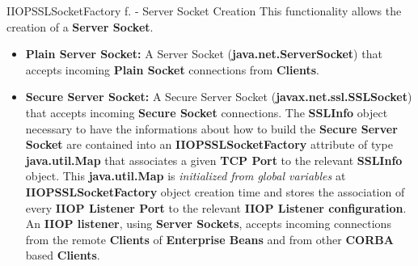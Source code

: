 \documentclass{../common/latex_classes/pdf_presentation}
\begin{document}
	\begin{frame}{IIOPSSLSocketFactory f. - Server Socket Creation}
		This functionality allows the creation of a \textbf{Server Socket}.
		\begin{itemize}
			\item \textbf{Plain Server Socket:}
				A Server Socket (\textbf{java.net.ServerSocket}) that accepts incoming \textbf{Plain Socket} connections from \textbf{Clients}.
			\item \textbf{Secure Server Socket:}
				A Secure Server Socket (\textbf{javax.net.ssl.SSLSocket}) that accepts incoming \textbf{Secure Socket} connections.
				The \textbf{SSLInfo} object necessary to have the informations about how to build the \textbf{Secure Server Socket} are contained into an \textbf{IIOPSSLSocketFactory} attribute of type \textbf{java.util.Map} that associates a given \textbf{TCP Port} to the relevant \textbf{SSLInfo} object.
				This \textbf{java.util.Map} is \textit{initialized from global variables}
				at \textbf{IIOPSSLSocketFactory} object creation time and stores the association of every \textbf{IIOP Listener Port} to the relevant \textbf{IIOP Listener configuration}.
				An \textbf{IIOP listener}, using \textbf{Server Sockets}, accepts incoming connections from the remote \textbf{Clients} of \textbf{Enterprise Beans} and from other \textbf{CORBA}
				based \textbf{Clients}.
		\end{itemize}
	\end{frame}
	
\end{document}
